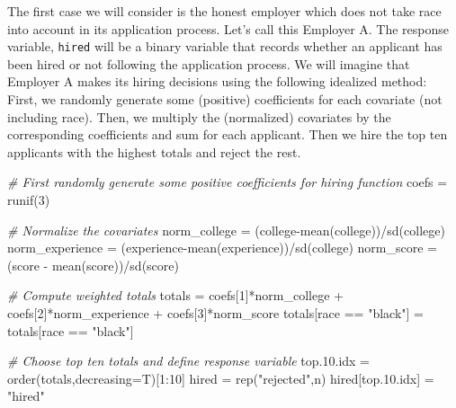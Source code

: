 \documentclass[
]{article}
\newenvironment{Shaded}{\begin{snugshade}}{\end{snugshade}}
\newcommand{\AttributeTok}[1]{\textcolor[rgb]{0.77,0.63,0.00}{#1}}
\newcommand{\CommentTok}[1]{\textcolor[rgb]{0.56,0.35,0.01}{\textit{#1}}}
\newcommand{\DecValTok}[1]{\textcolor[rgb]{0.00,0.00,0.81}{#1}}
\newcommand{\FloatTok}[1]{\textcolor[rgb]{0.00,0.00,0.81}{#1}}
\newcommand{\FunctionTok}[1]{\textcolor[rgb]{0.00,0.00,0.00}{#1}}
\newcommand{\NormalTok}[1]{#1}
\newcommand{\OtherTok}[1]{\textcolor[rgb]{0.56,0.35,0.01}{#1}}
\newcommand{\SpecialCharTok}[1]{\textcolor[rgb]{0.00,0.00,0.00}{#1}}
\newcommand{\StringTok}[1]{\textcolor[rgb]{0.31,0.60,0.02}{#1}}
\begin{document}
The first case we will consider is the honest employer which does not
take race into account in its application process. Let's call this
Employer A. The response variable, \texttt{hired} will be a binary
variable that records whether an applicant has been hired or not
following the application process. We will imagine that Employer A makes
its hiring decisions using the following idealized method: First, we
randomly generate some (positive) coefficients for each covariate (not
including race). Then, we multiply the (normalized) covariates by the
corresponding coefficients and sum for each applicant. Then we hire the
top ten applicants with the highest totals and reject the rest.

\begin{Shaded}
\begin{Highlighting}[]
\CommentTok{\# First randomly generate some positive coefficients for hiring function}
\NormalTok{coefs }\OtherTok{=} \FunctionTok{runif}\NormalTok{(}\DecValTok{3}\NormalTok{)}

\CommentTok{\# Normalize the covariates }
\NormalTok{norm\_college }\OtherTok{=}\NormalTok{ (college}\SpecialCharTok{{-}}\FunctionTok{mean}\NormalTok{(college))}\SpecialCharTok{/}\FunctionTok{sd}\NormalTok{(college)}
\NormalTok{norm\_experience }\OtherTok{=}\NormalTok{ (experience}\SpecialCharTok{{-}}\FunctionTok{mean}\NormalTok{(experience))}\SpecialCharTok{/}\FunctionTok{sd}\NormalTok{(college) }
\NormalTok{norm\_score }\OtherTok{=}\NormalTok{ (score }\SpecialCharTok{{-}} \FunctionTok{mean}\NormalTok{(score))}\SpecialCharTok{/}\FunctionTok{sd}\NormalTok{(score)}

\CommentTok{\# Compute weighted totals}
\NormalTok{totals }\OtherTok{=}\NormalTok{ coefs[}\DecValTok{1}\NormalTok{]}\SpecialCharTok{*}\NormalTok{norm\_college }\SpecialCharTok{+}\NormalTok{ coefs[}\DecValTok{2}\NormalTok{]}\SpecialCharTok{*}\NormalTok{norm\_experience }\SpecialCharTok{+}\NormalTok{ coefs[}\DecValTok{3}\NormalTok{]}\SpecialCharTok{*}\NormalTok{norm\_score}
\NormalTok{totals[race }\SpecialCharTok{==} \StringTok{"black"}\NormalTok{] }\OtherTok{=}\NormalTok{ totals[race }\SpecialCharTok{==} \StringTok{"black"}\NormalTok{]}

\CommentTok{\# Choose top ten totals and define response variable}
\NormalTok{top.}\FloatTok{10.}\NormalTok{idx }\OtherTok{=} \FunctionTok{order}\NormalTok{(totals,}\AttributeTok{decreasing=}\NormalTok{T)[}\DecValTok{1}\SpecialCharTok{:}\DecValTok{10}\NormalTok{]}
\NormalTok{hired }\OtherTok{=} \FunctionTok{rep}\NormalTok{(}\StringTok{"rejected"}\NormalTok{,n)}
\NormalTok{hired[top.}\FloatTok{10.}\NormalTok{idx] }\OtherTok{=} \StringTok{"hired"}
\end{Highlighting}
\end{Shaded}
\end{document}
